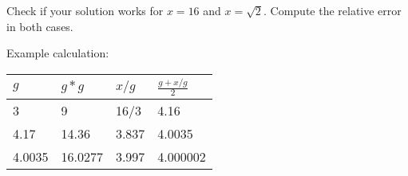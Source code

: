 \documentclass[a4paper,12pt]{article}
\begin{document}
\begin{enumerate}
	Check if your solution works for $x = 16$ and $x = \sqrt{2}$. Compute the relative error in both cases.
	
	Example calculation:

	\begin{table}[!h]
		\centering
		\begin{tabular}{llll}
			\toprule
			$g$  & $g*g$   & $x/g$ & $\frac{g + x/g}{2}$\\
			\midrule
			3    & 9       & 16/3  & 4.16             \\
			4.17  & 14.36   & 3.837 & 4.0035          \\
			4.0035 & 16.0277 & 3.997 & 4.000002       \\
			\bottomrule
		\end{tabular}
	\end{table}

\end{enumerate}
\end{document}
